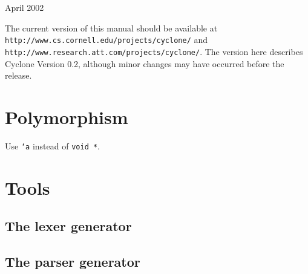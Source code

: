 \bigskip

\begin{center}
{\Large April 2002}
\end{center}

\bigskip

The current version of this manual should be available at\\
\texttt{http://www.cs.cornell.edu/projects/cyclone/} and\\
\texttt{http://www.research.att.com/projects/cyclone/}.  The version
here describes Cyclone Version 0.2, although minor changes may have
occurred before the release.

\newpage

\tableofcontents
\newpage







\section{Polymorphism}
\hypertarget{polymorphism}{}

Use \texttt{`a} instead of \texttt{void *}.








\appendix







\section{Tools}

\subsection{The lexer generator}
\subsection{The parser generator}



\printindex



